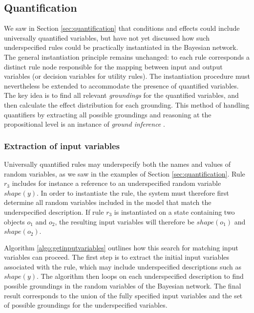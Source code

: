 \subsection{Quantification}
\label{sec:applicationquantif}

We saw in Section \ref{sec:quantification} that conditions and effects could include universally quantified variables, but have not yet discussed how such underspecified rules could be practically instantiated in the Bayesian network. The general instantiation principle remains unchanged: to each rule corresponds a distinct rule node responsible for the mapping between input and output variables (or decision variables for utility rules). The instantiation procedure must nevertheless be extended to accommodate the presence of quantified variables.  The key idea is to find all relevant \textit{groundings} for the quantified variables, and then calculate the effect distribution for each grounding. This method of handling quantifiers by extracting all possible groundings and reasoning at the propositional level is an instance of \textit{ground inference} \citep{getoor:srlbook07}. 

\subsubsection*{Extraction of input variables}

Universally quantified rules may underspecify both the names and values of random variables, as we saw in the examples of Section \ref{sec:quantification}.  Rule $r_3$ includes for instance a reference to an underspecified random variable $\mathit{shape}(y)$.  In order to instantiate the rule, the system must therefore first determine all random variables included in the model that match the underspecified description. If rule $r_3$ is instantiated on a state containing two objects $o_1$ and $o_2$, the resulting input variables will therefore be $\mathit{shape}(o_1)$ and $\mathit{shape}(o_2)$. 

Algorithm \ref{algo:getinputvariables} outlines how this search for matching input variables can proceed. The first step is to extract the initial input variables associated with the rule, which may include underspecified descriptions such as $\mathit{shape}(y)$. The algorithm then loops on each underspecified description to find possible groundings in the random variables of the Bayesian network.  The final result corresponds to the union of the fully specified input variables and the set of possible groundings for the underspecified variables.  

